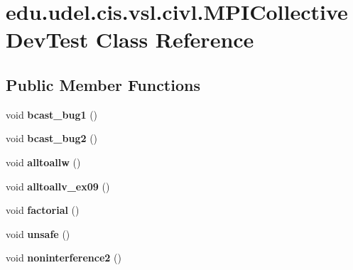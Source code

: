 \hypertarget{classedu_1_1udel_1_1cis_1_1vsl_1_1civl_1_1MPICollectiveDevTest}{}\section{edu.\+udel.\+cis.\+vsl.\+civl.\+M\+P\+I\+Collective\+Dev\+Test Class Reference}
\label{classedu_1_1udel_1_1cis_1_1vsl_1_1civl_1_1MPICollectiveDevTest}
\subsection*{Public Member Functions}
\begin{DoxyCompactItemize}
\item 
\hypertarget{classedu_1_1udel_1_1cis_1_1vsl_1_1civl_1_1MPICollectiveDevTest_a52e2996a70bbd150566395b3e33b6976}{}void {\bfseries bcast\+\_\+bug1} ()\label{classedu_1_1udel_1_1cis_1_1vsl_1_1civl_1_1MPICollectiveDevTest_a52e2996a70bbd150566395b3e33b6976}

\item 
\hypertarget{classedu_1_1udel_1_1cis_1_1vsl_1_1civl_1_1MPICollectiveDevTest_a70f2c3131a38aa87e542f32a68411590}{}void {\bfseries bcast\+\_\+bug2} ()\label{classedu_1_1udel_1_1cis_1_1vsl_1_1civl_1_1MPICollectiveDevTest_a70f2c3131a38aa87e542f32a68411590}

\item 
\hypertarget{classedu_1_1udel_1_1cis_1_1vsl_1_1civl_1_1MPICollectiveDevTest_a6befb64d3e9a3d58ce5822b8a29d8bc7}{}void {\bfseries alltoallw} ()\label{classedu_1_1udel_1_1cis_1_1vsl_1_1civl_1_1MPICollectiveDevTest_a6befb64d3e9a3d58ce5822b8a29d8bc7}

\item 
\hypertarget{classedu_1_1udel_1_1cis_1_1vsl_1_1civl_1_1MPICollectiveDevTest_a484b68f2145005bf7c8d37d50ca270dc}{}void {\bfseries alltoallv\+\_\+ex09} ()\label{classedu_1_1udel_1_1cis_1_1vsl_1_1civl_1_1MPICollectiveDevTest_a484b68f2145005bf7c8d37d50ca270dc}

\item 
\hypertarget{classedu_1_1udel_1_1cis_1_1vsl_1_1civl_1_1MPICollectiveDevTest_ac6f0f59ef70f4e2b843bbea72ec62b8d}{}void {\bfseries factorial} ()\label{classedu_1_1udel_1_1cis_1_1vsl_1_1civl_1_1MPICollectiveDevTest_ac6f0f59ef70f4e2b843bbea72ec62b8d}

\item 
\hypertarget{classedu_1_1udel_1_1cis_1_1vsl_1_1civl_1_1MPICollectiveDevTest_ae87c162d1028d905f9a97df4429c5df8}{}void {\bfseries unsafe} ()\label{classedu_1_1udel_1_1cis_1_1vsl_1_1civl_1_1MPICollectiveDevTest_ae87c162d1028d905f9a97df4429c5df8}

\item 
\hypertarget{classedu_1_1udel_1_1cis_1_1vsl_1_1civl_1_1MPICollectiveDevTest_ac408b954eabb3dbb6102d70792016824}{}void {\bfseries noninterference2} ()\label{classedu_1_1udel_1_1cis_1_1vsl_1_1civl_1_1MPICollectiveDevTest_ac408b954eabb3dbb6102d70792016824}

\end{DoxyCompactItemize}

